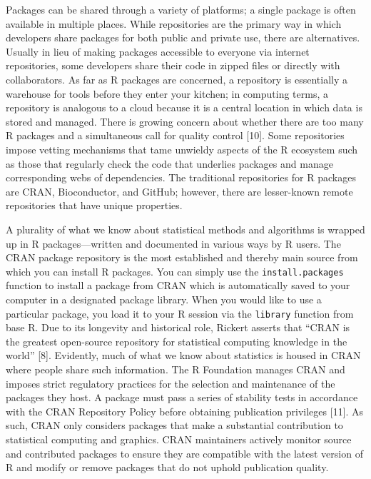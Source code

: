 \documentclass[10pt,letterpaper]{article}
\begin{document}
Packages can be shared through a variety of platforms; a single package
is often available in multiple places. While repositories are the
primary way in which developers share packages for both public and
private use, there are alternatives. Usually in lieu of making packages
accessible to everyone via internet repositories, some developers share
their code in zipped files or directly with collaborators. As far as R
packages are concerned, a repository is essentially a warehouse for
tools before they enter your kitchen; in computing terms, a repository
is analogous to a cloud because it is a central location in which data
is stored and managed. There is growing concern about whether there are
too many R packages and a simultaneous call for quality control
{[}10{]}. Some repositories impose vetting mechanisms that tame unwieldy
aspects of the R ecosystem such as those that regularly check the code
that underlies packages and manage corresponding webs of dependencies.
The traditional repositories for R packages are CRAN, Bioconductor, and
GitHub; however, there are lesser-known remote repositories that have
unique properties.

A plurality of what we know about statistical methods and algorithms is
wrapped up in R packages---written and documented in various ways by R
users. The CRAN package repository is the most established and thereby
main source from which you can install R packages. You can simply use
the \texttt{install.packages} function to install a package from CRAN
which is automatically saved to your computer in a designated package
library. When you would like to use a particular package, you load it to
your R session via the \texttt{library} function from base R. Due to its
longevity and historical role, Rickert asserts that ``CRAN is the
greatest open-source repository for statistical computing knowledge in
the world'' {[}8{]}. Evidently, much of what we know about statistics is
housed in CRAN where people share such information. The R Foundation
manages CRAN and imposes strict regulatory practices for the selection
and maintenance of the packages they host. A package must pass a series
of stability tests in accordance with the CRAN Repository Policy before
obtaining publication privileges {[}11{]}. As such, CRAN only considers
packages that make a substantial contribution to statistical computing
and graphics. CRAN maintainers actively monitor source and contributed
packages to ensure they are compatible with the latest version of R and
modify or remove packages that do not uphold publication quality.
\end{document}
